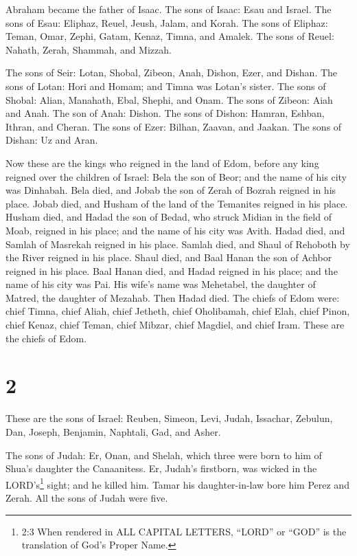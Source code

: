 Abraham became the father of Isaac. The sons of Isaac:
Esau and Israel.  The sons of Esau: Eliphaz, Reuel, Jeush,
Jalam, and Korah.  The sons of Eliphaz: Teman, Omar, Zephi,
Gatam, Kenaz, Timna, and Amalek.  The sons of Reuel:
Nahath, Zerah, Shammah, and Mizzah.

 The sons of Seir: Lotan, Shobal, Zibeon, Anah, Dishon,
Ezer, and Dishan.  The sons of Lotan: Hori and Homam; and
Timna was Lotan's sister.  The sons of Shobal: Alian,
Manahath, Ebal, Shephi, and Onam. The sons of Zibeon: Aiah and Anah.
 The son of Anah: Dishon. The sons of Dishon: Hamran,
Eshban, Ithran, and Cheran.  The sons of Ezer: Bilhan,
Zaavan, and Jaakan. The sons of Dishan: Uz and Aran.

 Now these are the kings who reigned in the land of Edom,
before any king reigned over the children of Israel: Bela the son of
Beor; and the name of his city was Dinhabah.  Bela died,
and Jobab the son of Zerah of Bozrah reigned in his place. 
Jobab died, and Husham of the land of the Temanites reigned in his
place.  Husham died, and Hadad the son of Bedad, who struck
Midian in the field of Moab, reigned in his place; and the name of his
city was Avith.  Hadad died, and Samlah of Masrekah reigned
in his place.  Samlah died, and Shaul of Rehoboth by the
River reigned in his place.  Shaul died, and Baal Hanan the
son of Achbor reigned in his place.  Baal Hanan died, and
Hadad reigned in his place; and the name of his city was Pai. His wife's
name was Mehetabel, the daughter of Matred, the daughter of Mezahab.
 Then Hadad died. The chiefs of Edom were: chief Timna,
chief Aliah, chief Jetheth,  chief Oholibamah, chief Elah,
chief Pinon,  chief Kenaz, chief Teman, chief Mibzar,
 chief Magdiel, and chief Iram. These are the chiefs of
Edom.

\hypertarget{section-1}{%
\section{2}\label{section-1}}

 These are the sons of Israel: Reuben, Simeon, Levi, Judah,
Issachar, Zebulun,  Dan, Joseph, Benjamin, Naphtali, Gad,
and Asher.

 The sons of Judah: Er, Onan, and Shelah, which three were
born to him of Shua's daughter the Canaanitess. Er, Judah's firstborn,
was wicked in the LORD's\footnote{2:3 When rendered in ALL CAPITAL
  LETTERS, ``LORD'' or ``GOD'' is the translation of God's Proper Name.}
sight; and he killed him.  Tamar his daughter-in-law bore
him Perez and Zerah. All the sons of Judah were five.

